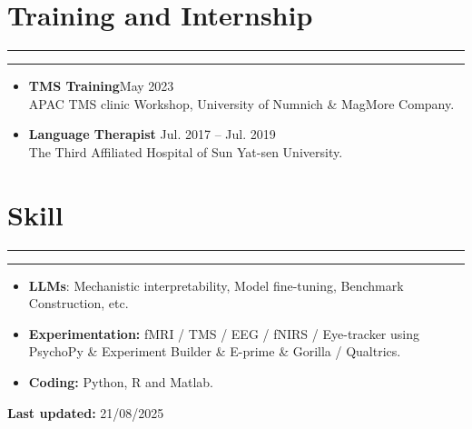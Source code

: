 \documentclass[11pt,a4paper]{article}
\begin{document}

\vspace{-1.2em} 
\section*{Training and Internship}
\vspace{-.5em} 
\hrule
\vspace{0.3ex}
\hrule
\begin{itemize}[leftmargin=*, labelsep=0.5em]
    \item \textbf{TMS Training}\hfill May 2023\\ APAC TMS clinic Workshop, University of Numnich \& MagMore Company.
    \item \textbf{Language Therapist} \hfill Jul. 2017 -- Jul. 2019\\ The Third Affiliated Hospital of Sun Yat-sen University.
\end{itemize}

\vspace{-2.5em} 
\section*{Skill}
\vspace{-.5em} 
\hrule
\vspace{0.3ex}
\hrule
\begin{itemize}[leftmargin=*, labelsep=0.5em]
    \item \textbf{LLMs}: Mechanistic interpretability, Model fine-tuning, Benchmark Construction, etc.
    \item \textbf{Experimentation:} fMRI / TMS / EEG / fNIRS / Eye-tracker using PsychoPy \& Experiment Builder \& E-prime \& Gorilla / Qualtrics.
    \item \textbf{Coding:} Python, R and Matlab.
\end{itemize}
\vspace{-1em} 

\centering \textbf{Last updated:} 21/08/2025
\end{document}
